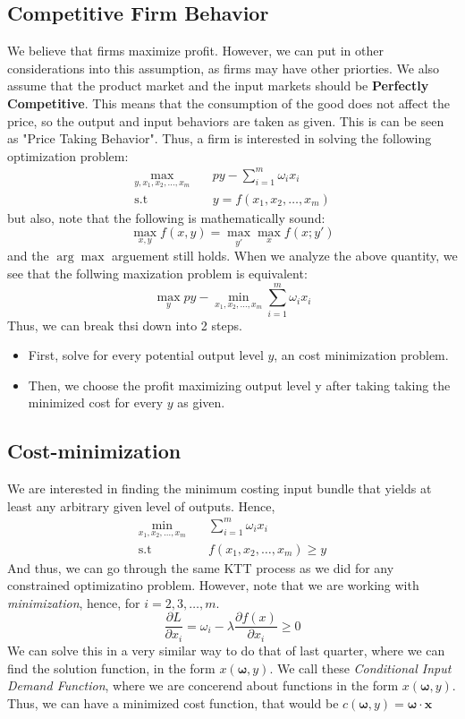 \documentclass[12pt]{article}
\newcommand{\st}{\text{s.t}}
\begin{document}
\subsection{Competitive Firm Behavior}
We believe that firms maximize profit. However, we can put in other considerations into this assumption, as firms may have other priorties. We also assume that the product market and the input markets should be \textbf{Perfectly Competitive}. This means that the consumption of the good does not affect the price, so the output and input behaviors are taken as given. This is can be seen as "Price Taking Behavior". Thus, a firm is interested in solving the following optimization problem:
\begin{align*}
    \max_{y, x_1, x_2, \dots, x_m} & \quad py - \sum_{i =1}^m \omega_i  x_i \\
    \st & \quad y = f(x_1,x_2, \dots, x_m)
\end{align*}
but also, note that the following is mathematically sound:
\[
\max_{x,y} f(x,y) = \max_{y'} \max_x f(x; y')
\]
and the $\arg \max$ arguement still holds. When we analyze the above quantity, we see that the follwing maxization problem is equivalent:
\[
    \max_y py - \min_{x_1, x_2, \dots, x_m} \sum_{i =1}^m \omega_i x_i
\]
Thus, we can break thsi down into 2 steps. 
\begin{itemize}
    \item First, solve for every potential output level $y$, an cost minimization problem.
    \item Then, we choose the profit maximizing output level y after taking taking the minimized cost for every $y$ as given. 
\end{itemize}
\subsection{Cost-minimization}
We are interested in finding the minimum costing input bundle that yields at least any arbitrary given level of outputs. Hence,
\begin{align*}
    \min_{x_1, x_2, \dots, x_m} & \quad \sum_{i =1}^{m} \omega_i x_i\\
    \st & \quad f(x_1, x_2, \dots, x_m) \geq y
\end{align*}
And thus, we can go through the same KTT process as we did for any constrained optimizatino problem. However, note that we are working with \emph{minimization}, hence, for $i = 2, 3, \dots, m$. 
\[
\frac{\partial L}{\partial x_i} = \omega_i - \lambda \frac{\partial f(x)}{\partial x_i} \geq 0
\]
We can solve this in a very similar way to do that of last quarter, where we can find the solution function, in the form $x(\mathbf{\omega}, y)$. We call these \emph{Conditional Input Demand Function}, where we are concerend about functions in the form $x(\mathbf{\omega}, y)$. Thus, we can have a minimized cost function, that would be $c(\mathbf{\omega}, y) = \mathbf{\omega} \cdot \mathbf{x}$
\end{document}
